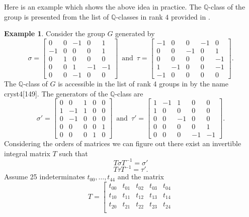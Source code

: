 \documentclass[a4paper, 14pt]{extarticle}
\theoremstyle{plain}
\theoremstyle{definition}
\newtheorem{example}[theorem]{Example}
\newcommand{\Q}{\ensuremath{\mathbb{Q}}}
\newcommand{\tand}{\ensuremath{\,\,\, \text{and} \,\,\,}}
\begin{document}
Here is an example which shows the above idea in practice. The $\Q$-class of the group is presented from the list of $\Q$-classes in rank $4$ provided in \cite{Hoshi}.
\begin{example}\label{exmp:Decompose}
Consider the group $G$ generated by 
$$
\sigma = \left[\begin{array}{rrrrr}
0 & 0 & -1 & 0 & 1 \\
-1 & 0 & 0 & 0 & 1 \\
0 & 1 & 0 & 0 & 0 \\
0 & 0 & 1 & -1 & -1 \\
0 & 0 & -1 & 0 & 0
\end{array}\right]
 \tand
\tau = \left[\begin{array}{rrrrr}
-1 & 0 & 0 & -1 & 0 \\
0 & 0 & -1 & 0 & 1 \\
0 & 0 & 0 & 0 & -1 \\
1 & -1 & 0 & 0 & -1 \\
-1 & 0 & 0 & 0 & 0
\end{array}\right].
$$
The $\Q$-class of $G$ is accessible in the list of rank 4 groups in \cite{Hoshi} by the name cryst4[149]. The generators of the $\Q$-class are
$$
\sigma' =\left[\begin{array}{rrr|rr}
0 & 0 & 1 & 0 & 0 \\
1 & -1 & 1 & 0 & 0 \\
0 & -1 & 0 & 0 & 0 \\
\hline
0 & 0 & 0 & 0 & 1 \\
0 & 0 & 0 & 1 & 0
\end{array}\right]
 \tand
\tau' = \left[\begin{array}{rrr|rr}
1 & -1 & 1 & 0 & 0 \\
1 & 0 & 0 & 0 & 0 \\
0 & 0 & -1 & 0 & 0 \\
\hline
0 & 0 & 0 & 0 & 1 \\
0 & 0 & 0 & -1 & -1
\end{array}\right].
$$
Considering the orders of matrices we can figure out there exist an invertible integral matrix $T$ such that 
$$T\sigma T^{-1}= \sigma'$$
$$T\tau T^{-1} = \tau'.$$
Assume 25 indeterminates $t_{00}  ,\ldots , t_{44}$ and the matrix
$$
T =\left[\begin{array}{rrrrr}
t_{00} & t_{01} & t_{02} & t_{03} & t_{04} \\
t_{10} & t_{11} & t_{12} & t_{13} & t_{14} \\
t_{20} & t_{21} & t_{22} & t_{23} & t_{24} \\

\end{array}$$
\end{example}
\end{document}
